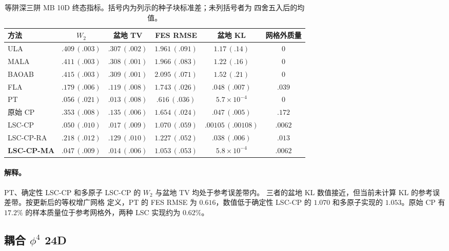 \documentclass[11pt,a4paper]{article}
\renewcommand{\textsc}[1]{\textsf{\MakeUppercase{#1}}}
\begin{document}
\begin{table}[H]
\centering
\footnotesize
\setlength{\tabcolsep}{4.2pt}
\begin{tabular}{lccccc}
\toprule
方法 & $W_2$ & 盆地 TV & FES RMSE & 盆地 KL & 网格外质量 \\
\midrule
\textsc{ula} & $.409\,(.003)$ & $.307\,(.002)$ & $1.961\,(.091)$ & $1.17\,(.14)$ & $0$ \\
\textsc{mala} & $.411\,(.003)$ & $.308\,(.001)$ & $1.966\,(.083)$ & $1.22\,(.16)$ & $0$ \\
\textsc{baoab} & $.415\,(.003)$ & $.309\,(.001)$ & $2.095\,(.071)$ & $1.52\,(.21)$ & $0$ \\
\textsc{fla} & $.179\,(.006)$ & $.119\,(.008)$ & $1.743\,(.026)$ & $.048\,(.007)$ & $.039$ \\
\textsc{pt} & $.056\,(.021)$ & $.013\,(.008)$ & $.616\,(.036)$ & $5.7{\times}10^{-4}$ & $0$ \\
原始 \textsc{cp} & $.353\,(.008)$ & $.135\,(.006)$ & $1.654\,(.024)$ & $.047\,(.005)$ & $.172$ \\
\textsc{lsc-cp} & $.050\,(.010)$ & $.017\,(.009)$ & $1.070\,(.059)$ & $.00105\,(.00108)$ & $.0062$ \\
\textsc{lsc-cp-ra} & $.218\,(.012)$ & $.129\,(.010)$ & $1.227\,(.052)$ & $.038\,(.006)$ & $.013$ \\
\textbf{\textsc{lsc-cp-ma}} & $.047\,(.009)$ & $.014\,(.006)$ & $1.053\,(.053)$ & $5.8{\times}10^{-4}$ & $.0062$ \\
\bottomrule
\end{tabular}
\caption{等阱深三阱 MB 10D 终态指标。括号内为列示的种子块标准差；未列括号者为
四舍五入后的均值。}
\end{table}

\paragraph{解释。}
PT、确定性 LSC-CP 和多原子 LSC-CP 的 $W_2$ 与盆地 TV 均处于参考误差带内。
三者的盆地 KL 数值接近，但当前未计算 KL 的参考误差带。按更新后的等权增广网格
定义，PT 的 FES RMSE 为 $0.616$，数值低于确定性 LSC-CP 的 $1.070$ 和多原子实现的
$1.053$。原始 CP 有 $17.2\%$ 的样本质量位于参考网格外，两种 LSC 实现约为
$0.62\%$。

\subsection{耦合 \texorpdfstring{$\phi^4$}{phi4} 24D}
\end{document}
